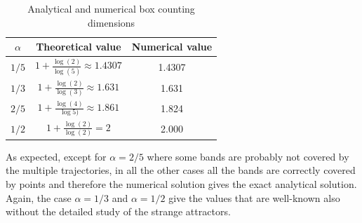 \documentclass[11pt,titlepage]{article}
\begin{document}
\begin{table}[h]
	\centering
	\caption{Analytical and numerical box counting dimensions} \label{tab7}
	\begin{tabular}{ | c | c | c |}
		\hline
		$\alpha$ & Theoretical value & Numerical value \\
		\hline
		$1/5$ & $1 + \frac{\log(2)}{\log(5)} \approx 1.4307$& 1.4307\\
		\hline
		 $1/3$ & $1 + \frac{\log(2)}{\log(3)} \approx 1.631$& 1.631\\
		 \hline
		 $2/5$ & $1 + \frac{\log(4)}{\log5)} \approx 1.861$& 1.824\\
		 \hline
		 $1/2$ & $1 + \frac{\log(2)}{\log(2)} = 2$& 2.000\\
		\hline
	\end{tabular}
\end{table}

As expected, except for $\alpha=2/5$ where some bands are probably not covered by the multiple trajectories, in all the other cases all the bands are correctly covered by points and therefore the numerical solution gives the exact analytical solution. Again, the case $\alpha=1/3$ and $\alpha=1/2$ give the values that are well-known also without the detailed study of the strange attractors.
\end{document}
